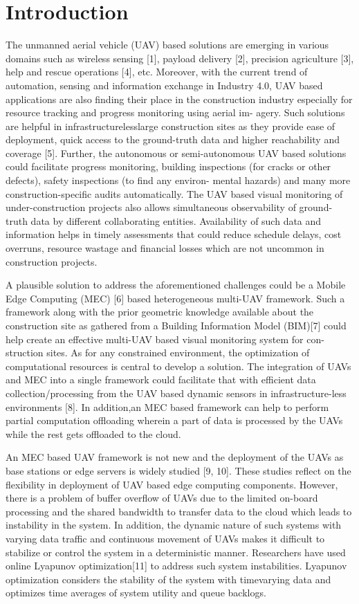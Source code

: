 \documentclass[11pt,twocolumn]{article}
\begin{document}
\section{Introduction}
The unmanned aerial vehicle (UAV) based solutions are emerging in various domains such as wireless sensing [1],
payload delivery [2], precision agriculture [3], help and rescue operations [4], etc. Moreover, with the current
trend of automation, sensing and information exchange in Industry 4.0, UAV based applications are also finding
their place in the construction industry especially for resource tracking and progress monitoring using aerial im-
agery. Such solutions are helpful in infrastructurelesslarge construction sites as they provide ease of deployment, quick access to the ground-truth data and higher reachability and coverage [5]. Further, the autonomous or semi-autonomous UAV based solutions could facilitate progress monitoring, building inspections (for cracks or other defects), safety inspections (to find any environ- mental hazards) and many more construction-specific audits automatically. The UAV based visual monitoring of 
under-construction projects also allows simultaneous observability of ground-truth data by different collaborating 
entities. Availability of such data and information helps in timely assessments that could reduce schedule delays,
cost overruns, resource wastage and financial losses which are not uncommon in construction projects.

A plausible solution to address the aforementioned challenges could be a Mobile Edge Computing (MEC) [6] based heterogeneous multi-UAV framework. Such a framework along with the prior geometric knowledge available about the construction site as gathered from a Building Information Model (BIM)[7] could help create an effective multi-UAV based visual monitoring system for con-
struction sites. As for any constrained environment, the optimization of computational resources is central to develop a solution. The integration of UAVs and MEC into a single framework could facilitate that with efficient data collection/processing from the UAV based dynamic sensors in infrastructure-less environments [8]. In addition,an MEC based framework can help to perform partial computation offloading wherein a part of data is processed by the UAVs while the rest gets offloaded to the cloud.

An MEC based UAV framework is not new and the deployment of the UAVs as base stations or edge servers is widely studied [9, 10]. These studies reflect on the flexibility in deployment of UAV based edge computing components. However, there is a problem of buffer overflow of UAVs due to the limited on-board processing and the shared bandwidth to transfer data to the cloud which leads to instability in the system. In addition, the dynamic nature of such systems with varying data traffic and continuous movement of UAVs makes it difficult to stabilize or control the system in a deterministic manner. Researchers have used online Lyapunov optimization[11] to address such system instabilities. Lyapunov optimization considers the stability of the system with timevarying data and optimizes time averages of system utility and queue backlogs.
\end{document}
